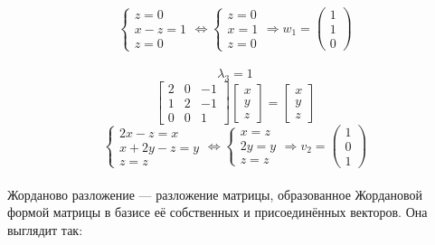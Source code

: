 \documentclass[a3paper,14pt]{extarticle}
\begin{document}
$$\begin{cases}
    z=0 \\
    x-z=1 \\
    z = 0
\end{cases} \Leftrightarrow \begin{cases}
    z=0 \\
    x=1 \\
    z=0
\end{cases} \Rightarrow w_1 = \begin{pmatrix}
    1 \\ 1 \\ 0
\end{pmatrix}$$\,\\
$$\lambda_3 = 1$$
$$\begin{bmatrix}
    2 & 0 & -1 \\ 1 & 2 & -1 \\ 0 & 0 & 1
\end{bmatrix}\begin{bmatrix}
    x \\ y \\ z
\end{bmatrix} = \begin{bmatrix}
    x \\ y \\ z
\end{bmatrix}$$
$$\begin{cases}
    2x-z=x \\
    x+2y-z=y \\
    z = z
\end{cases} \Leftrightarrow \begin{cases}
    x=z \\
    2y = y \\
    z = z
\end{cases} \Rightarrow v_2 = \begin{pmatrix}
    1 \\ 0 \\ 1
\end{pmatrix}$$\,\\[10mm]
Жорданово разложение --- разложение матрицы, образованное Жордановой формой матрицы в базисе её собственных и присоединённых векторов. Она выглядит так:
\end{document}
